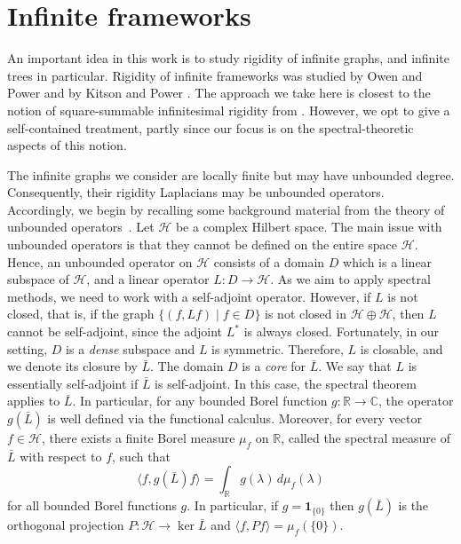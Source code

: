 \documentclass[reqno,english]{amsart}
\numberwithin{equation}{section}
\theoremstyle{definition}{
\newtheorem{example}[theorem]{Example}
\newtheorem{definition}[theorem]{Definition}
\newtheorem*{definition*}{Definition}
\newtheorem{problem}[theorem]{Problem}
\newtheorem{question}[theorem]{Question}
}
\newcommand{\R}{\mathbb R}
\newcommand{\C}{\mathbb C}
\newcommand{\cH}{\mathcal H}
\begin{document}
\section{Infinite frameworks}\label{sec:inf_fram}
An important idea in this work is to study rigidity of infinite graphs, and
infinite trees in particular. Rigidity of infinite frameworks was studied by
Owen and Power \cite{OwenPowerInfiniteFrameworksOperatorTheory} and by
Kitson and Power \cite{KitsonPowerRigidityInfiniteGraphs}. The approach we
take here is closest to the notion of square-summable
infinitesimal rigidity from \cite{OwenPowerInfiniteFrameworksOperatorTheory}.
However, we opt to give a self-contained treatment, partly since our focus is on the spectral-theoretic aspects of this notion.

The infinite graphs we consider are locally finite but may have unbounded degree. Consequently, their rigidity Laplacians may be unbounded operators. Accordingly, we begin by recalling some background material from the theory of unbounded operators~\cite{ReedSimonI}.
Let $\cH$ be a complex Hilbert space. The main issue with unbounded operators is that they cannot be defined on the entire space $\cH$. Hence, an unbounded operator on $\cH$ consists of a domain $D$ which is a linear subspace of $\cH$, and a linear operator $L:D\to \cH$. As we aim to apply spectral methods, we need to work with a self-adjoint operator. However, if $L$ is not closed, that is, if the graph $\{(f,Lf)\mid f\in D\}$ is not closed in $\cH\oplus\cH$, then $L$ cannot be self-adjoint, since the adjoint $L^*$ is always closed. 
Fortunately, in our setting, $D$ is a {\em dense} subspace and $L$ is symmetric. Therefore, $L$ is closable, and we denote its closure by $\bar L$. The domain $D$ is a {\em core} for $\bar L$.
We say that $L$ is essentially self-adjoint if $\bar L$ is self-adjoint.
In this case, the spectral theorem applies to $\bar L$. In particular, for any bounded Borel function $g:\R\to\C$, the operator $g(\bar L)$ is well defined via the functional calculus. Moreover, for every vector $f\in\cH$, there exists a finite Borel measure $\mu_f$ on $\R$, called the spectral measure of $\bar L$ with respect to $f$, such that
\[
\langle f, g(\bar L) f\rangle = \int_\R g(\lambda)\, d\mu_f(\lambda)
\]
for all bounded Borel functions $g$. In particular, if $g=\mathbf 1_{\{0\}}$ then $g(\bar L)$ is the orthogonal projection $P:\cH\to\ker\bar L$ and $\langle f,Pf\rangle=\mu_f(\{0\})$.
\end{document}

